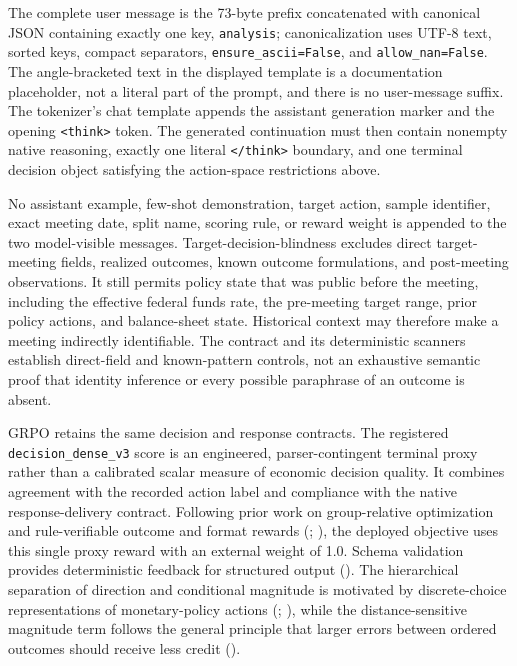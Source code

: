 The complete user message is the 73-byte prefix concatenated with canonical
JSON containing exactly one key, \texttt{analysis}; canonicalization uses
UTF-8 text, sorted keys, compact separators, \texttt{ensure\_ascii=False}, and
\texttt{allow\_nan=False}. The angle-bracketed text in the displayed template
is a documentation placeholder, not a literal part of the prompt, and there is
no user-message suffix. The tokenizer's chat template appends the assistant
generation marker and the opening \texttt{<think>} token. The generated
continuation must then contain nonempty native reasoning, exactly one literal
\texttt{</think>} boundary, and one terminal decision object satisfying the
action-space restrictions above.

No assistant example, few-shot demonstration, target action, sample identifier,
exact meeting date, split name, scoring rule, or reward weight is appended to
the two model-visible messages. Target-decision-blindness excludes direct
target-meeting fields, realized outcomes, known outcome formulations, and
post-meeting observations. It still permits policy state that was public before
the meeting, including the effective federal funds rate, the pre-meeting target
range, prior policy actions, and balance-sheet state. Historical context may
therefore make a meeting indirectly identifiable. The contract and its
deterministic scanners establish direct-field and known-pattern controls, not
an exhaustive semantic proof that identity inference or every possible
paraphrase of an outcome is absent.

GRPO retains the same decision and response contracts. The registered
\texttt{decision\_dense\_v3} score is an engineered, parser-contingent terminal
proxy rather than a calibrated scalar measure of economic decision quality. It
combines agreement with the recorded action label and compliance with the
native response-delivery contract. Following prior work on group-relative
optimization and rule-verifiable outcome and format rewards
(\cite{shao2024deepseekmath}; \cite{guo2025deepseek}), the deployed objective
uses this single proxy reward with an external weight of 1.0. Schema validation
provides deterministic feedback for structured output
(\cite{lu2025schema}). The hierarchical separation of direction and conditional
magnitude is motivated by discrete-choice representations of monetary-policy
actions (\cite{hamiltonjorda2002target}; \cite{scotti2011bivariate}), while the
distance-sensitive magnitude term follows the general principle that larger
errors between ordered outcomes should receive less credit
(\cite{fathony2017adversarial}).

